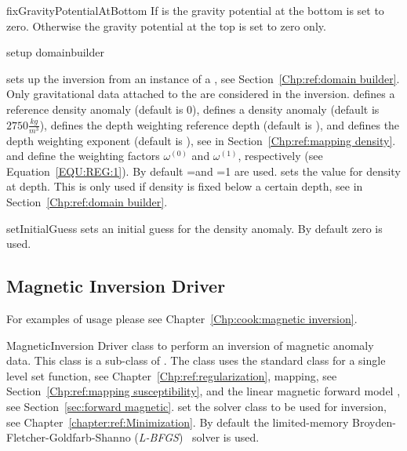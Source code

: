 \begin{methoddesc}[GravityInversion]{fixGravityPotentialAtBottom}{}
If  is \True the gravity potential at the bottom is set to zero. Otherwise  the gravity
 potential at the top is set to zero only. 
\end{methoddesc}

\begin{methoddesc}[GravityInversion]{setup}{
domainbuilder
}

sets up the inversion from an instance  of a , see Section~\ref{Chp:ref:domain builder}.
Only gravitational data attached to the  are considered in the inversion.
 defines a reference density anomaly (default is 0), 
 defines a density anomaly (default is $2750 \frac{kg}{m^3}$),
 defines the depth weighting reference depth (default is \None), and
 defines the depth weighting exponent (default is \None),
see  in Section~\ref{Chp:ref:mapping density}.
 and  define the weighting factors
$\omega^{(0)}$ and
$\omega^{(1)}$, respectively (see Equation~\ref{EQU:REG:1}).
By default =\None and =1 are used.
 sets the value for density at depth. This is only used if density is fixed below a certain depth,
see  in Section~\ref{Chp:ref:domain builder}.
\end{methoddesc}

\begin{methoddesc}[GravityInversion]{setInitialGuess}{}
sets an initial guess for the density anomaly. By default zero is used.
\end{methoddesc}

\subsection{Magnetic Inversion Driver}
For examples of usage please see Chapter~\ref{Chp:cook:magnetic inversion}.

\begin{classdesc}{MagneticInversion}{
}
Driver class to perform an inversion of magnetic anomaly data. This class
is a sub-class of . The class uses the standard
 class for a single level set function, see Chapter~\ref{Chp:ref:regularization},
 mapping, see Section~\ref{Chp:ref:mapping susceptibility}, and the linear
magnetic forward model , see Section~\ref{sec:forward magnetic}.
 set the solver class to be used for inversion,
see Chapter~\ref{chapter:ref:Minimization}.
 By default the limited-memory Broyden-Fletcher-Goldfarb-Shanno (\emph{L-BFGS})~\cite{Nocedal1980} solver is used.

\end{classdesc}

